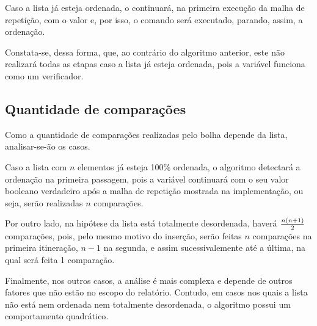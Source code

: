 Caso a lista já esteja ordenada, o  continuará, na primeira execução da malha de repetição, com o valor  e, por isso, o comando  será executado, parando, assim, a ordenação.

Constata-se, dessa forma, que, ao contrário do algoritmo anterior, este não realizará todas as etapas caso a lista já esteja ordenada, pois a variável  funciona como um verificador.

\subsection{Quantidade de comparações}
Como a quantidade de comparações realizadas pelo bolha depende da lista, analisar-se-ão os casos. 

Caso a lista com $n$ elementos já esteja 100\% ordenada, o algoritmo detectará a ordenação na primeira passagem, pois a variável  continuará com o seu valor booleano verdadeiro após a malha de repetição mostrada na implementação, ou seja, serão realizadas $n$ comparações.

Por outro lado, na hipótese da lista está totalmente desordenada, haverá $n(n+1)\over 2$ comparações, pois, pelo mesmo motivo do inserção, serão feitas $n$ comparações na primeira itineração, $n-1$ na segunda, e assim sucessivalemente até a última, na qual será feita 1 comparação.

Finalmente, nos outros casos, a análise é mais complexa e depende de outros fatores que não estão no escopo do relatório. Contudo, em casos nos quais a lista não está nem ordenada nem totalmente desordenada, o algoritmo possui um comportamento quadrático\cite{bubblecomplexity}.